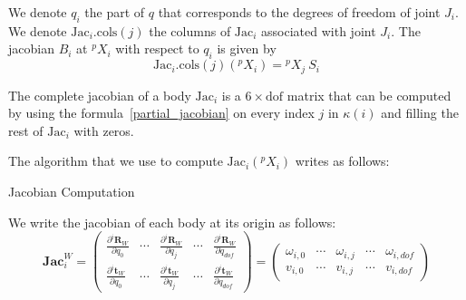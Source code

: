 We denote $q_i$ the part of $q$ that corresponds to the degrees of freedom of joint $J_i$.
We denote $\text{Jac}_i.\text{cols}(j)$ the columns of $\text{Jac}_i$ associated with joint $J_i$.
The jacobian $B_i$ at ${}^p X_i$ with respect to $q_i$ is given by
\begin{equation}
\label{partial_jacobian}
  \text{Jac}_i.\text{cols}(j)({}^p X_i) = {}^p X_j\ S_i
\end{equation}

The complete jacobian of a body $\text{Jac}_i$ is a $6\times \text{dof}$ matrix that can be computed by using the formula~\ref{partial_jacobian} on every index $j$ in $\kappa(i)$ and filling the rest of $\text{Jac}_i$ with zeros.

The algorithm that we use to compute $\text{Jac}_i({}{}^p X_i)$ writes as follows:

\begin{algorithm}
  \caption{Jacobian Computation}
\label{Jacobian}
\begin{algorithmic}
  \EndFor{}
\end{algorithmic}
\end{algorithm}



We write the jacobian of each body at its origin as follows:
\begin{equation}
  \mathbf{Jac}^W_i = 
  \begin{pmatrix}
    \frac{\partial {}^i\mathbf{R}_W}{\partial q_0} & \cdots &
    \frac{\partial {}^i\mathbf{R}_W}{\partial q_j} & \cdots &
    \frac{\partial {}^i\mathbf{R}_W}{\partial q_{dof}} \\
    \frac{\partial {}^i\mathbf{t}_W}{\partial q_0} & \cdots &
    \frac{\partial {}^i\mathbf{t}_W}{\partial q_j} & \cdots &
    \frac{\partial {}^i\mathbf{t}_W}{\partial q_{dof}}
  \end{pmatrix}
= 
  \begin{pmatrix}
    \omega_{i,0} & \cdots &
    \omega_{i,j} & \cdots &
    \omega_{i,dof} \\
    v_{i,0} & \cdots &
    v_{i,j} & \cdots &
    v_{i,dof}
  \end{pmatrix}
\end{equation}



